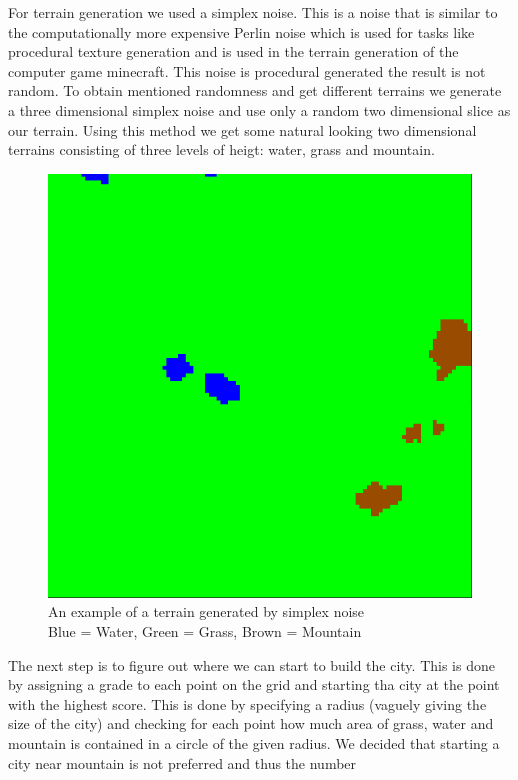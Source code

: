\documentclass{scrartcl}
\begin{document}
For terrain generation we used a simplex noise. This is a noise that is similar
to the computationally more expensive Perlin noise which is used for tasks like
procedural texture generation and is used in the terrain generation of the computer
game minecraft. This noise is procedural generated the result is not random. To
obtain mentioned randomness and get different terrains we generate
a three dimensional simplex noise and use only a random two dimensional slice as our terrain.
Using this method we get some natural looking two dimensional terrains consisting
of three levels of heigt: water, grass and mountain.
\begin{figure}
  \centering
  \includegraphics[scale = 0.2]{terrain_example}
  \caption{An example of a terrain generated by simplex noise \\Blue = Water, Green = Grass, Brown = Mountain}
\end{figure}
The next step is to figure out where we can start to build the city. This is done
by assigning a grade to each point on the grid and starting tha city at the point
with the highest score. This is done by specifying a radius (vaguely giving
the size of the city) and checking for each point how much area of grass,
water and mountain is contained in a circle of the given radius.
We decided that starting a city near mountain is not preferred and thus the number
\end{document}
